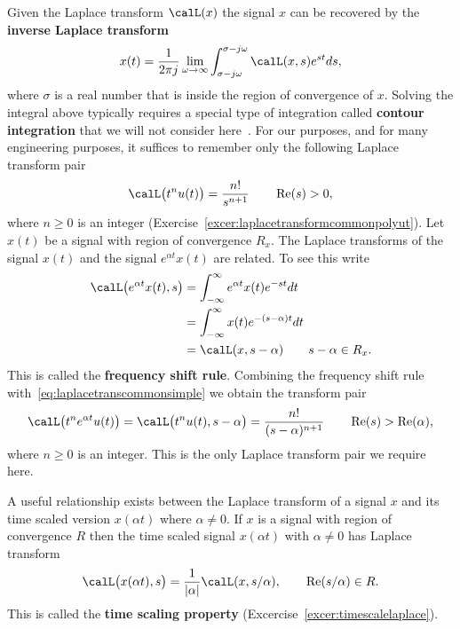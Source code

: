 \documentclass[11pt,a4paper]{book}
\theoremstyle{plain}
\numberwithin{equation}{section}
\renewcommand{\Re}{\operatorname{Re}}
\newcommand{\term}{\textbf}
\newcommand{\abs}[1]{\left\vert #1 \right\vert}
\begin{document}
Given the Laplace transform $\calL(x)$ the signal $x$ can be recovered by the \term{inverse Laplace transform}
\[
x(t) = \frac{1}{2\pi j} \lim_{\omega \rightarrow\infty} \int_{\sigma - j\omega}^{\sigma - j\omega} \calL(x,s) e^{st} ds,
\]
where $\sigma$ is a real number that is inside the region of convergence of $x$.  Solving the integral above typically requires a special type of integration called \term{contour integration} that we will not consider here~\citep{Stewart_ComplexAnalysis_2004}.  For our purposes, and for many engineering purposes, it suffices to remember only the following Laplace transform pair
\begin{equation}\label{eq:laplacetranscommonsimple}
\calL\big(t^n u(t)\big) = \frac{n!}{s^{n+1}} \qquad \Re(s) > 0,
\end{equation}
where $n \geq 0$ is an integer (Exercise~\ref{excer:laplacetransformcommonpolyut}).  Let $x(t)$ be a signal with region of convergence $R_x$.  The Laplace transforms of the signal $x(t)$ and the signal $e^{\alpha t}x(t)$ are related.  To see this write
\begin{align}
\calL\big( e^{\alpha t} x(t), s\big) &= \int_{-\infty}^{\infty} e^{\alpha t} x(t)  e^{-s t} dt \nonumber \\
&= \int_{-\infty}^{\infty} x(t)  e^{-(s-\alpha) t} dt \nonumber \\
&=  \calL(x, s-\alpha) \qquad s - \alpha \in R_x. \label{eq:freqshiftrule}
\end{align}
This is called the \term{frequency shift rule}.  Combining the frequency shift rule with~\eqref{eq:laplacetranscommonsimple} we obtain the transform pair
\begin{equation}\label{eq:laplacetneucommon}
\calL\big( t^n e^{\alpha t} u(t) \big) = \calL\big(t^n u(t), s - \alpha\big) = \frac{n!}{(s-\alpha)^{n+1}} \qquad \Re(s) > \Re(\alpha),
\end{equation}
where $n \geq 0$ is an integer.  This is the only Laplace transform pair we require here.  

A useful relationship exists between the Laplace transform of a signal $x$ and its time scaled version $x(\alpha t)$ where $\alpha \neq 0$.  If $x$ is a signal with region of convergence $R$ then the time scaled signal $x(\alpha t)$ with $\alpha \neq 0$ has Laplace transform
\begin{equation}\label{eq:timescalingpropertrylaplacetrans}
 \calL\big(x(\alpha t),s\big) = \frac{1}{\abs{\alpha}}\calL(x, s/\alpha), \qquad \Re(s/\alpha) \in R.
\end{equation}
This is called the \term{time scaling property} (Excercise~\ref{excer:timescalelaplace}).
\end{document}
